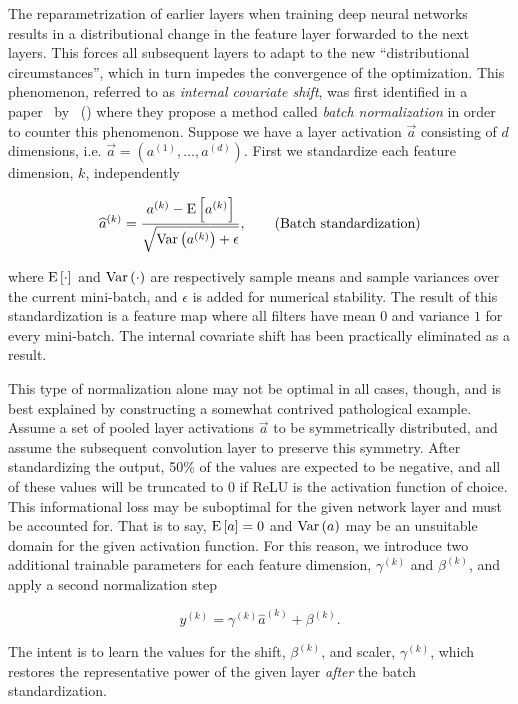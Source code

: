 The reparametrization of earlier layers when training deep neural networks results in a distributional change in the feature layer forwarded to the next layers.
This forces all subsequent layers to adapt to the new \enquote{distributional circumstances}, which in turn impedes the convergence of the optimization.
This phenomenon, referred to as \textit{internal covariate shift}, was first identified in a paper~\cite{batch-normalization} by \citeauthor{batch-normalization}~(\citeyear{batch-normalization}) where they propose a method called \textit{batch normalization} in order to counter this phenomenon.
Suppose we have a layer activation $\vec{a}$ consisting of $d$ dimensions, i.e. $\vec{a} = (a^{(1)}, \ldots, a^{(d)})$.
First we standardize each feature dimension, $k$, independently

\begin{equation*}
  \widehat{a}^{(k)}
  =
  \frac{
    a^{(k)} - \mathrm{E} \left[a^{(k)} \right]
  }{
    \sqrt{\mathrm{Var} \left(a^{(k)} \right) + \epsilon}
  },
  \tag{Batch standardization}
\end{equation*}

where $\mathrm{E} \left[\cdot \right]$ and $\mathrm{Var} \left(\cdot \right)$ are respectively sample means and sample variances over the current mini-batch, and $\epsilon$ is added for numerical stability.
The result of this standardization is a feature map where all filters have mean $0$ and variance $1$ for every mini-batch.
The internal covariate shift has been practically eliminated as a result.

This type of normalization alone may not be optimal in all cases, though, and is best explained by constructing a somewhat contrived pathological example.
Assume a set of pooled layer activations $\vec{a}$ to be symmetrically distributed, and assume the subsequent convolution layer to preserve this symmetry.
After standardizing the output, 50\% of the values are expected to be negative, and all of these values will be truncated to $0$ if ReLU is the activation function of choice.
This informational loss may be suboptimal for the given network layer and must be accounted for.
That is to say, $\mathrm{E} \left[a \right] =  0$ and $\mathrm{Var} \left(a \right)$ may be an unsuitable domain for the given activation function.
For this reason, we introduce two additional trainable parameters for each feature dimension, $\gamma^{(k)}$ and $\beta^{(k)}$, and apply a second normalization step

\begin{equation*}
  y^{(k)} = \gamma^{(k)} \widehat{a}^{(k)} + \beta^{(k)}.
  \tag{Trainable normalization}
\end{equation*}

The intent is to learn the values for the shift, $\beta^{(k)}$, and scaler, $\gamma^{(k)}$, which restores the representative power of the given layer \textit{after} the batch standardization.
